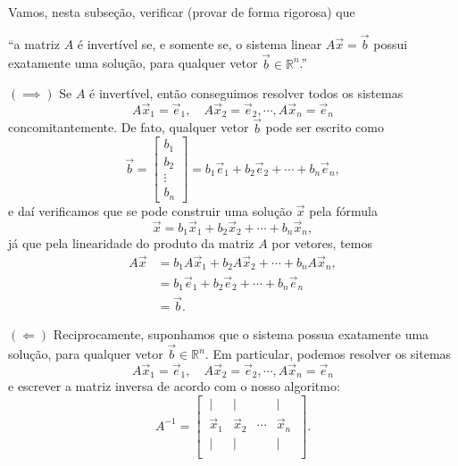 \documentclass[../livro.tex]{subfiles}  %
\begin{document}
Vamos, nesta subseção, verificar (provar de forma rigorosa) que
\begin{center}
  ``a matriz $A$ é invertível se, e somente se, o sistema linear $A \vec{x} = \vec{b}$ possui exatamente uma solução, para qualquer vetor $\vec{b} \in \mathbb{R}^n$.''
\end{center}

\noindent $(\!\implies\!\!)$ Se $A$ é invertível, então conseguimos resolver todos os sistemas
\begin{equation}
A \vec{x}_1 = \vec{e}_1, \quad A \vec{x}_2 = \vec{e}_2, \cdots, A \vec{x}_n = \vec{e}_n
\end{equation} concomitantemente. De fato, qualquer vetor $\vec{b}$ pode ser escrito como
\begin{equation}
\vec{b} =  
\left[
\begin{array}{c}
b_1 \\
b_2 \\
\vdots \\
b_n 
\end{array}
\right] = 
b_1 \vec{e}_1 + b_2 \vec{e}_2 + \cdots + b_n \vec{e}_n,
\end{equation} e daí verificamos que se pode construir uma solução $\vec{x}$ pela fórmula
\begin{equation}
\vec{x} = b_1 \vec{x}_1 + b_2 \vec{x}_2 + \cdots + b_n \vec{x}_n,
\end{equation} já que pela linearidade do produto da matriz $A$ por vetores, temos
\begin{align*}
A  \vec{x} & = b_1 A\vec{x}_1 + b_2 A\vec{x}_2 + \cdots + b_n A\vec{x}_n, \\
& = b_1 \vec{e}_1 + b_2 \vec{e}_2 + \cdots + b_n \vec{e}_n \\
& = \vec{b}.
\end{align*}

\noindent $(\!\Longleftarrow)$ Reciprocamente, suponhamos que o sistema possua exatamente uma solução, para qualquer vetor $\vec{b} \in \mathbb{R}^n$. Em particular, podemos resolver os sitemas
\begin{equation}
A \vec{x}_1 = \vec{e}_1, \quad A \vec{x}_2 = \vec{e}_2, \cdots, A \vec{x}_n = \vec{e}_n
\end{equation} e escrever a matriz inversa de acordo com o nosso algoritmo:
\begin{equation}
A^{-1} = 
\begin{bmatrix}
\ |  &  |  &   & | \ \\
\ \vec{x}_1  &  \vec{x}_2 & \cdots & \vec{x}_n \ \\
\ |  &  |  &   & | \ \\
\end{bmatrix}.
\end{equation}
\end{document}
